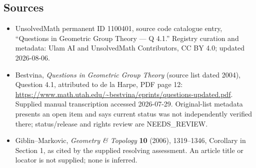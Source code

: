 \documentclass[11pt]{article}
\begin{document}
\subsection{Sources}
\begin{itemize}
\item UnsolvedMath permanent ID 1100401, source code catalogue entry, ``Questions in Geometric Group Theory --- Q 4.1.'' Registry curation and metadata: Ulam AI and UnsolvedMath Contributors, CC BY 4.0; updated 2026-08-06.
\item Bestvina, \emph{Questions in Geometric Group Theory} (source list dated 2004), Question 4.1, attributed to de la Harpe, PDF page 12: \url{https://www.math.utah.edu/~bestvina/eprints/questions-updated.pdf}. Supplied manual transcription accessed 2026-07-29. Original-list metadata presents an open item and says current status was not independently verified there; status/release and rights review are NEEDS\_REVIEW.
\item Giblin--Markovic, \emph{Geometry \& Topology} \textbf{10} (2006), 1319--1346, Corollary in Section 1, as cited by the supplied resolving assessment. An article title or locator is not supplied; none is inferred.
\end{itemize}
\end{document}
